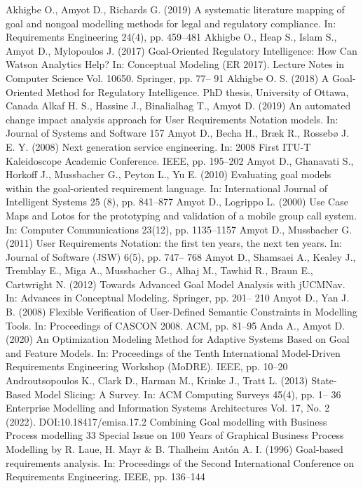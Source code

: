 Akhigbe O., Amyot D., Richards G. (2019) A
systematic literature mapping of goal and nongoal modelling methods for legal and regulatory
compliance. In: Requirements Engineering 24(4),
pp. 459–481
Akhigbe O., Heap S., Islam S., Amyot D., Mylopoulos J. (2017) Goal-Oriented Regulatory Intelligence: How Can Watson Analytics Help? In:
Conceptual Modeling (ER 2017). Lecture Notes
in Computer Science Vol. 10650. Springer, pp. 77–
91
Akhigbe O. S. (2018) A Goal-Oriented Method
for Regulatory Intelligence. PhD thesis, University
of Ottawa, Canada
Alkaf H. S., Hassine J., Binalialhag T., Amyot
D. (2019) An automated change impact analysis
approach for User Requirements Notation models.
In: Journal of Systems and Software 157
Amyot D., Becha H., Bræk R., Rossebø J. E. Y.
(2008) Next generation service engineering. In:
2008 First ITU-T Kaleidoscope Academic Conference. IEEE, pp. 195–202
Amyot D., Ghanavati S., Horkoff J., Mussbacher
G., Peyton L., Yu E. (2010) Evaluating goal models
within the goal-oriented requirement language. In:
International Journal of Intelligent Systems 25 (8),
pp. 841–877
Amyot D., Logrippo L. (2000) Use Case Maps
and Lotos for the prototyping and validation of
a mobile group call system. In: Computer Communications 23(12), pp. 1135–1157
Amyot D., Mussbacher G. (2011) User Requirements Notation: the first ten years, the next ten
years. In: Journal of Software (JSW) 6(5), pp. 747–
768
Amyot D., Shamsaei A., Kealey J., Tremblay E.,
Miga A., Mussbacher G., Alhaj M., Tawhid R.,
Braun E., Cartwright N. (2012) Towards Advanced
Goal Model Analysis with jUCMNav. In: Advances in Conceptual Modeling. Springer, pp. 201–
210
Amyot D., Yan J. B. (2008) Flexible Verification of
User-Defined Semantic Constraints in Modelling
Tools. In: Proceedings of CASCON 2008. ACM,
pp. 81–95
Anda A., Amyot D. (2020) An Optimization Modeling Method for Adaptive Systems Based on Goal
and Feature Models. In: Proceedings of the Tenth
International Model-Driven Requirements Engineering Workshop (MoDRE). IEEE, pp. 10–20
Androutsopoulos K., Clark D., Harman M., Krinke
J., Tratt L. (2013) State-Based Model Slicing: A
Survey. In: ACM Computing Surveys 45(4), pp. 1–
36
Enterprise Modelling and Information Systems Architectures
Vol. 17, No. 2 (2022). DOI:10.18417/emisa.17.2
Combining Goal modelling with Business Process modelling 33
Special Issue on 100 Years of Graphical Business Process Modelling by R. Laue, H. Mayr & B. Thalheim
Antón A. I. (1996) Goal-based requirements analysis. In: Proceedings of the Second International
Conference on Requirements Engineering. IEEE,
pp. 136–144
